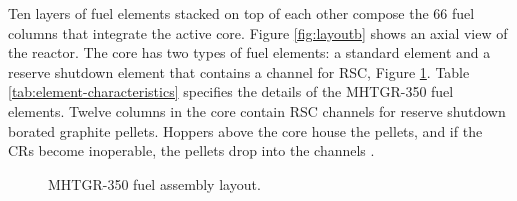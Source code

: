 Ten layers of fuel elements stacked on top of each other compose the 66 fuel columns that integrate the active core.
Figure \ref{fig:layoutb} shows an axial view of the reactor.
The core has two types of fuel elements: a standard element and a reserve shutdown element that contains a channel for \gls{RSC}, Figure \ref{fig:fuelassembly}.
Table \ref{tab:element-characteristics} specifies the details of the MHTGR-350 fuel elements.
Twelve columns in the core contain \gls{RSC} channels for reserve shutdown borated graphite pellets.
Hoppers above the core house the pellets, and if the \glspl{CR} become inoperable, the pellets drop into the channels \cite{oecd_nea_benchmark_2017}.

\begin{figure}[htbp!]
  \centering
  \hfill
    \caption{MHTGR-350 fuel assembly layout.}
  \label{fig:fuelassembly}
\end{figure}

